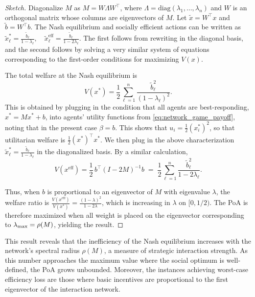 \documentclass{notices}
\theoremstyle{definition}\newtheorem{problem}{Problem}
\theoremstyle{definition} \newtheorem{remark}{Remark}
\theoremstyle{definition} \newtheorem{claim}{Claim}
\renewcommand{\max}{\operatornamewithlimits{max}}
\theoremstyle{definition} \newtheorem{thm}{Theorem}
\theoremstyle{definition} \newtheorem*{thmNoNum}{Theorem}
\theoremstyle{definition} \newtheorem{definition}{Definition}
\theoremstyle{definition} \theoremstyle{remark}
\theoremstyle{definition} \newtheorem{note}{Note}
\theoremstyle{definition} \newtheorem{notation}{Notation}
\theoremstyle{definition} \theoremstyle{plain}
\theoremstyle{definition} \newtheorem{condition}{Condition}
\theoremstyle{definition} \newtheorem{lem}{Lemma}
\theoremstyle{definition} \newtheorem{corollary}{Corollary}
\theoremstyle{definition} \newtheorem{prop}{Proposition}
\theoremstyle{definition} \newtheorem{ax}{Axiom}
\theoremstyle{definition} \newtheorem{assumption}{Assumption}
\theoremstyle{definition} \newtheorem{example}{Example}
\theoremstyle{definition} \newtheorem{rmk}{Remark}
\theoremstyle{definition} \newtheorem{res}{Result}
\theoremstyle{definition} \newtheorem{que}{Question}
\theoremstyle{definition} \newtheorem{conjecture}{Conjecture}
\theoremstyle{definition}
\begin{document}
\begin{proof}[Sketch]

Diagonalize $M$ as $M = W \Lambda W^\top$, where $\Lambda = \text{diag}(\lambda_1, \ldots, \lambda_n)$ and $W$ is an orthogonal matrix whose columns are eigenvectors of $M$. Let $\tilde{x} = W^\top x$ and $\tilde{b} = W^\top b$. The Nash equilibrium and socially efficient actions can be written as
$
\tilde{x}_\ell^* = \frac{\tilde{b}_\ell}{1 -  \lambda_\ell}, \quad \tilde{x}_\ell^{\mathrm{eff}} = \frac{\tilde{b}_\ell}{1 - 2 \lambda_\ell}.
$ The first follows from rewriting  in the diagonal basis, and the second follows by solving a very similar system of equations corresponding to the first-order conditions for maximizing $V(x)$.

The total welfare at the Nash equilibrium is
\begin{equation}
V(x^*) = \frac{1}{2} \sum_{\ell=1}^n \frac{\tilde{b}_\ell^2}{(1 -  \lambda_\ell)^2}.  \end{equation} This is obtained by plugging in the condition that all agents are best-responding, $x^*=Mx^* + b$, into agents' utility functions from \cref{eq:network_game_payoff}, noting that in the present case $\beta=b$. This shows that $u_i = \frac{1}{2}(x_i^*)^2$, so that utilitarian welfare is $\frac{1}{2} (x^*)^\top x^*$. We then plug in the above characterization $\tilde{x}_\ell^* = \frac{\tilde{b}_\ell}{1 -  \lambda_\ell}$ in the diagonalized basis. By a similar calculation,
\begin{equation}
V(x^{\mathrm{eff}}) = \frac{1}{2}\, b^\top (I-2M)^{-1} b
 \;=\; \frac{1}{2} \sum_{\ell=1}^n \frac{\tilde{b}_\ell^2}{1 - 2 \lambda_\ell}.
\end{equation}

Thus, when $b$ is proportional to an eigenvector of $M$ with eigenvalue $\lambda$, the welfare ratio is
$\frac{V(x^{\mathrm{eff}})}{V(x^*)}=\frac{(1-\lambda)^2}{1-2\lambda}$, which is increasing in $\lambda$ on $[0,1/2)$. The PoA is therefore maximized when all weight is placed on the eigenvector corresponding to $\lambda_{\max} = \rho(M)$, yielding the result.
\end{proof}

This result reveals that the inefficiency of the Nash equilibrium increases with the network's spectral radius $\rho(M)$, a measure of strategic interaction strength. As this number approaches the maximum value where the social optimum is well-defined, the PoA grows unbounded. Moreover, the instances achieving worst-case efficiency loss are those where basic incentives are proportional to the first eigenvector of the interaction network.
\end{document}
